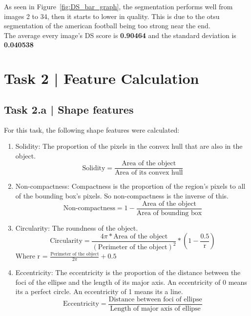 \documentclass[conference]{IEEEtran}
\begin{document}
        As seen in Figure~\ref{fig:DS_bar_graph}, the segmentation performs well from images 2 to 34, then it starts to lower in quality.
        This is due to the otsu segmentation of the american football being too strong near the end.\\
        The average every image's DS score is \textbf{0.90464} and the standard deviation is \textbf{0.040538} 

\section*{Task 2 | Feature Calculation}

    \subsection*{Task 2.a | Shape features}

        For this task, the following shape features were calculated:
        \begin{enumerate}
            \item Solidity: The proportion of the pixels in the convex hull that are also in the object.
            \[\text{Solidity} = \frac{\text{Area of the object}}{\text{Area of its convex hull}}\]
            \item Non-compactness: Compactness is the proportion of the region's pixels to all of the bounding box's pixels. So non-compactness is the inverse of this.
            \[\text{Non-compactness} = 1 - \frac{\text{Area of the object}}{\text{Area of bounding box}}\]
            \item Circularity: The roundness of the object.
            \[\text{Circularity} = \frac{4\pi * \text{Area of the object}}{{(\text{Perimeter of the object})}^2} * \left(1 - \frac{0.5}{{\text{r}}}\right)\]
            Where r = $\frac{\text{Perimeter of the object}}{2\pi} + 0.5$
            \item Eccentricity: The eccentricity is the proportion of the distance between the foci of the ellipse and the length of its major axis. An eccentricity of 0 means its a perfect circle. An eccentricity of 1 means its a line.
            \[\text{Eccentricity} = \frac{\text{Distance between foci of ellipse}}{\text{Length of major axis of ellipse}}\]
        \end{enumerate}
\end{document}
